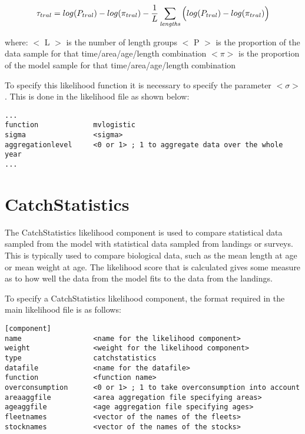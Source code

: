 \documentclass[10pt,twoside]{book}
\begin{document}
\begin{equation}\label{eq:catchdist6b}
\tau_{tral} = log(P_{tral}) - log(\pi_{tral}) - \frac{1}{L}\sum_{\it lengths} \Big(log(P_{tral}) - log(\pi_{tral}) \Big)
\end{equation}

where:\newline
$<$ L $>$ is the number of length groups\newline
$<$ P $>$ is the proportion of the data sample for that time/area/age/length combination\newline
$<\pi>$ is the proportion of the model sample for that time/area/age/length combination

\bigskip
To specify this likelihood function it is necessary to specify the parameter $<\sigma>$. This is done in the likelihood file as shown below:

{\small\begin{verbatim}
...
function             mvlogistic
sigma                <sigma>
aggregationlevel     <0 or 1> ; 1 to aggregate data over the whole year
...
\end{verbatim}}

\section{CatchStatistics}\label{sec:catchstat}
The CatchStatistics likelihood component is used to compare statistical data sampled from the model with statistical data sampled from landings or surveys.  This is typically used to compare biological data, such as the mean length at age or mean weight at age.  The likelihood score that is calculated gives some measure as to how well the data from the model fits to the data from the landings.

\bigskip
To specify a CatchStatistics likelihood component, the format required in the main likelihood file is as follows:

{\small\begin{verbatim}
[component]
name                 <name for the likelihood component>
weight               <weight for the likelihood component>
type                 catchstatistics
datafile             <name for the datafile>
function             <function name>
overconsumption      <0 or 1> ; 1 to take overconsumption into account
areaaggfile          <area aggregation file specifying areas>
ageaggfile           <age aggregation file specifying ages>
fleetnames           <vector of the names of the fleets>
stocknames           <vector of the names of the stocks>
\end{verbatim}}
\end{document}
